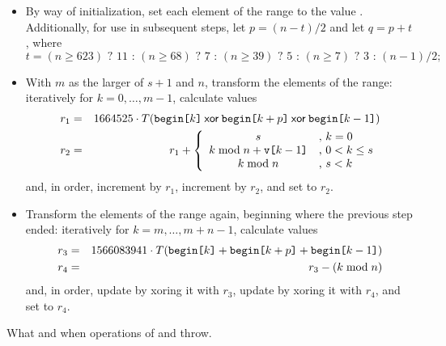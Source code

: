 \begin{itemdescr}
\begin{itemize}
 \item
   By way of initialization,
   set each element of the range to the value .
   Additionally,
   for use in subsequent steps,
   let $p = (n - t) / 2$
   and let $q = p + t$,
   where
   \[%
     t = (n \ge 623) \mbox{ ? } 11 \mbox{ : } (n \ge 68) \mbox{ ? } 7 \mbox{ : } (n \ge 39) \mbox{ ? } 5 \mbox{ : } (n \ge 7) \mbox{ ? } 3 \mbox{ : } (n - 1)/2;
   \]%
 \item
   With $m$ as the larger of $s + 1$ and $n$,
   transform the elements of the range:
   iteratively for $k = 0, \dotsc, m - 1$,
   calculate values
   \begin{eqnarray*}
     r_1 & = &
       1664525 \cdot T(    \texttt{begin[}k\texttt{]}
                      \mathbin{\mathsf{xor}} \texttt{begin[}k+p\texttt{]}
                      \mathbin{\mathsf{xor}} \texttt{begin[}k-1 \texttt{]}
                      )
     \\
     r_2 & = & r_1 + \left\{
       \begin{array}{cl}
         s                                  & \mbox{,  } k = 0
         \\
         k \bmod n + \texttt{v[}k-1\texttt{]} & \mbox{,  } 0 < k \le s
         \\
         k \bmod n                          & \mbox{,  } s < k
       \end{array}
     \right.
   \end{eqnarray*}
   and, in order,
   increment  by $r_1$,
   increment  by $r_2$,
   and
   set  to $r_2$.
 \item
   Transform the elements of the range again,
   beginning where the previous step ended:
   iteratively for $k = m, \dotsc, m + n - 1$,
   calculate values
   \begin{eqnarray*}
     r_3 & = &
       1566083941 \cdot T( \texttt{begin[}k  \texttt{]}
                         + \texttt{begin[}k+p\texttt{]}
                         + \texttt{begin[}k-1\texttt{]}
                         )
     \\
     r_4 & = & r_3 - (k \bmod n)
   \end{eqnarray*}
   and, in order,
   \noindent
   update  by xoring it with $r_3$,
   update  by xoring it with $r_4$,
   and
   set  to $r_4$.
\end{itemize}

\pnum
\throws
What and when  operations of 
and  throw.
\end{itemdescr}

